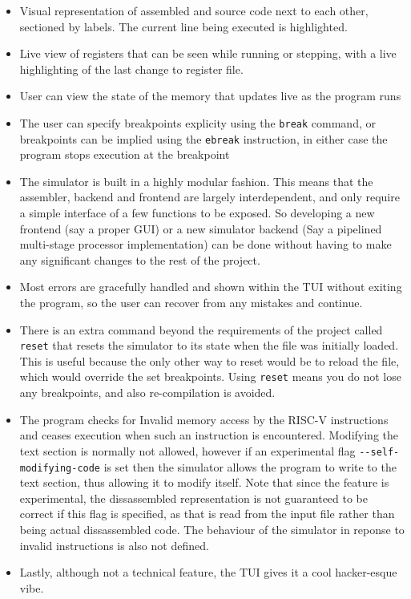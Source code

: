 \documentclass[12pt]{article}
\begin{document}
	\begin{itemize}
		\item Visual representation of assembled and source code next to each other, sectioned by labels. The current line being executed is highlighted.

		\item Live view of registers that can be seen while running or stepping, with a live highlighting of the last change to register file.
		
		\item User can view the state of the memory that updates live as the program runs
		
		\item The user can specify breakpoints explicity using the \verb|break| command, or breakpoints can be implied using the \verb|ebreak| instruction, in either case the program stops execution at the breakpoint
		
		\item The simulator is built in a highly modular fashion. This means that the assembler, backend and frontend are largely interdependent, and only require a simple interface of a few functions to be exposed. So developing a new frontend (say a proper GUI) or a new simulator backend (Say a pipelined multi-stage processor implementation) can be done without having to make any significant changes to the rest of the project.
		
		\item Most errors are gracefully handled and shown within the TUI without exiting the program, so the user can recover from any mistakes and continue.
		
		\item There is an extra command beyond the requirements of the project called \verb|reset| that resets the simulator to its state when the file was initially loaded. This is useful because the only other way to reset would be to reload the file, which would override the set breakpoints. Using \verb|reset| means you do not lose any breakpoints, and also re-compilation is avoided.
		
		\item The program checks for Invalid memory access by the RISC-V instructions and ceases execution when such an instruction is encountered. Modifying the text section is normally not allowed, however if an experimental flag \verb|--self-modifying-code| is set then the simulator allows the program to write to the text section, thus allowing it to modify itself. Note that since the feature is experimental, the dissassembled representation is not guaranteed to be correct if this flag is specified, as that is read from the input file rather than being actual dissassembled code. The behaviour of the simulator in reponse to invalid instructions is also not defined.
		
		\item Lastly, although not a technical feature, the TUI gives it a cool hacker-esque vibe.
	\end{itemize}
	
\end{document}
